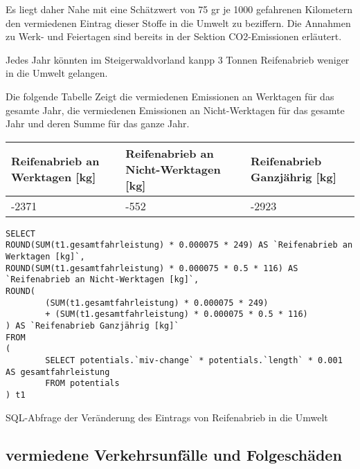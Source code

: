 \documentclass[fontsize=12pt,a4paper]{scrreprt}
\begin{document}
\vspace{1em}

Es liegt daher Nahe mit eine Schätzwert von 75 gr je 1000 gefahrenen Kilometern den vermiedenen Eintrag dieser Stoffe in die Umwelt zu beziffern. Die Annahmen zu Werk- und Feiertagen sind bereits in der Sektion CO2-Emissionen erläutert.

\vspace{1em}

Jedes Jahr könnten im Steigerwaldvorland kanpp 3 Tonnen Reifenabrieb weniger in die Umwelt gelangen.

\vspace{1em}

Die folgende Tabelle Zeigt die vermiedenen Emissionen an Werktagen für das gesamte Jahr, die vermiedenen Emissionen an Nicht-Werktagen für das gesamte Jahr und deren Summe für das ganze Jahr.

\vspace{1em}

\begin{tabular}{|l | l | l |}
        \hline
        Reifenabrieb an Werktagen [kg] & Reifenabrieb an Nicht-Werktagen [kg] & Reifenabrieb Ganzjährig [kg] \\
        \hline
        -2371                          & -552                                 & -2923                        \\
        \hline
\end{tabular}

\begin{listing}[htbp]
        \begin{verbatim}
SELECT 
ROUND(SUM(t1.gesamtfahrleistung) * 0.000075 * 249) AS `Reifenabrieb an Werktagen [kg]`, 
ROUND(SUM(t1.gesamtfahrleistung) * 0.000075 * 0.5 * 116) AS `Reifenabrieb an Nicht-Werktagen [kg]`, 
ROUND(
        (SUM(t1.gesamtfahrleistung) * 0.000075 * 249) 
        + (SUM(t1.gesamtfahrleistung) * 0.000075 * 0.5 * 116)
) AS `Reifenabrieb Ganzjährig [kg]`
FROM
(
        SELECT potentials.`miv-change` * potentials.`length` * 0.001 AS gesamtfahrleistung
        FROM potentials
) t1
\end{verbatim}
        \caption{SQL-Abfrage der Veränderung des Eintrags von Reifenabrieb in die Umwelt}\label{lst-emmissionen-reifenabrieb}
\end{listing}

\subsection{vermiedene Verkehrsunfälle und Folgeschäden}
\end{document}
